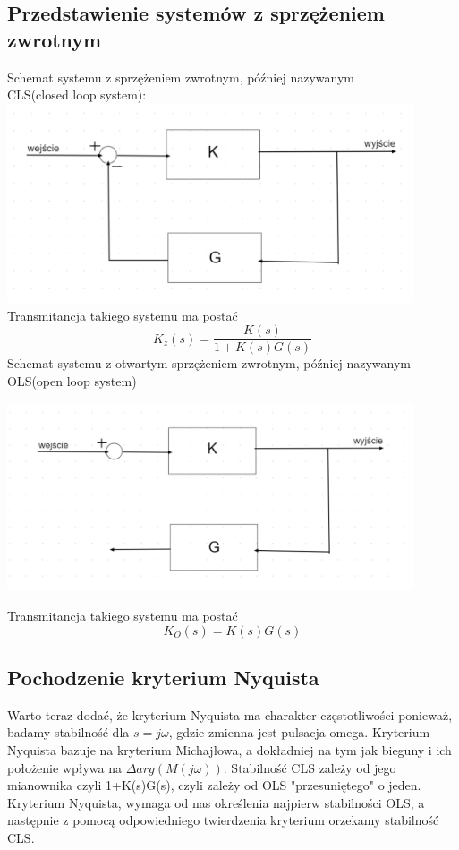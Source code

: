 \documentclass{article}
\begin{document}
\subsection{Przedstawienie systemów z sprzężeniem zwrotnym}
Schemat systemu z sprzężeniem zwrotnym, później nazywanym \\CLS(closed loop system):\\
\includegraphics[width=12cm]{cls.png}\\
Transmitancja takiego systemu ma postać
$$K_z(s)=\frac{K(s)}{1+K(s)G(s)}$$
Schemat systemu z otwartym sprzężeniem zwrotnym, później nazywanym OLS(open loop system)
\begin{center}
\includegraphics[width=12cm]{ols.png}    
\end{center}
Transmitancja takiego systemu ma postać
$$K_O(s)=K(s)G(s)$$
\newpage
\subsection{Pochodzenie kryterium Nyquista}
Warto teraz dodać, że kryterium Nyquista ma charakter częstotliwości ponieważ, badamy stabilność dla $s=j\omega$, gdzie zmienna jest pulsacja omega. Kryterium Nyquista bazuje na kryterium Michajłowa, a dokładniej na tym jak bieguny i ich położenie wpływa na $\Delta arg(M(j\omega))$. Stabilność CLS zależy od jego mianownika czyli 1+K(s)G(s), czyli zależy od OLS "przesuniętego" o jeden. Kryterium Nyquista, wymaga od nas określenia najpierw stabilności OLS, a następnie z pomocą odpowiedniego twierdzenia kryterium orzekamy stabilność CLS.\\
\end{document}
